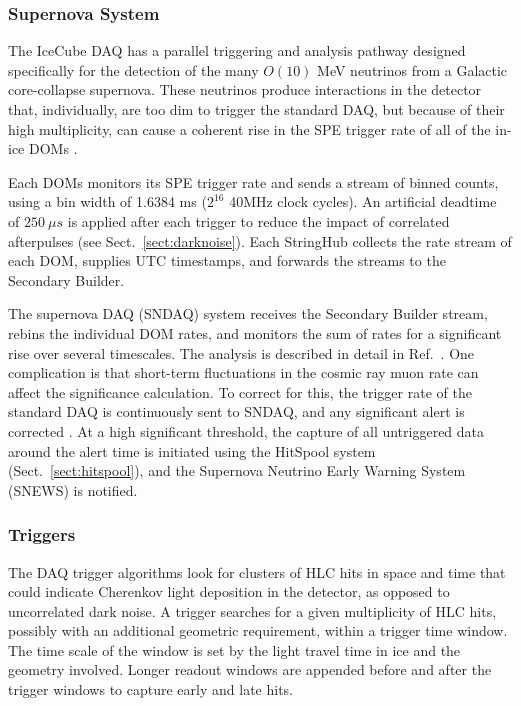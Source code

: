 \subsubsection{Supernova System}

The IceCube DAQ has a parallel triggering and analysis pathway designed
specifically for the detection of the many $O(10)$ MeV neutrinos from a Galactic
core-collapse supernova.  These neutrinos produce interactions in the
detector that, individually, are too dim to trigger the standard DAQ, but because of their
high multiplicity, can cause a coherent rise in the SPE trigger rate of all
of the in-ice DOMs \cite{IC3:supernova}. 

Each DOMs monitors its SPE trigger rate and sends a stream of binned
counts, using a bin width of 1.6384 ms ($2^{16}$ 40MHz clock cycles).  An
artificial deadtime of $250\ {\mu}s$ is applied after each trigger to
reduce the impact of correlated afterpulses (see
Sect.~\ref{sect:darknoise}).  Each StringHub
collects the rate stream of each DOM, supplies UTC timestamps, and
forwards the streams to the Secondary Builder.  

The supernova DAQ (SNDAQ) system receives the Secondary Builder stream,
rebins the individual DOM rates, and monitors the sum of rates for a
significant rise over several timescales.  The analysis is described in
detail in Ref.~\cite{IC3:supernova}.  One complication is that short-term
fluctuations in the cosmic ray muon rate can affect the significance
calculation.  To correct for this, the trigger rate of the standard DAQ is
continuously sent to SNDAQ, and any significant alert is corrected
\cite{IC3:icrc15_sndaq}.  At a 
high significant threshold, the capture of all untriggered data around the
alert time is initiated using the HitSpool system
(Sect.~\ref{sect:hitspool}), and the Supernova Neutrino Early Warning
System (SNEWS) \cite{SNEWS} is notified.

\subsubsection{\label{sect:online:trigger}Triggers}

The DAQ trigger algorithms look for clusters of HLC hits in space and time
that could indicate Cherenkov light deposition in the detector, as opposed
to uncorrelated dark noise.  A trigger searches for a given multiplicity of
HLC hits, possibly with an additional geometric requirement, within a
trigger time window.  The time scale of the window is set by the light
travel time in ice and the geometry involved. Longer readout windows 
are appended before and after the trigger windows to capture early and late
hits.

